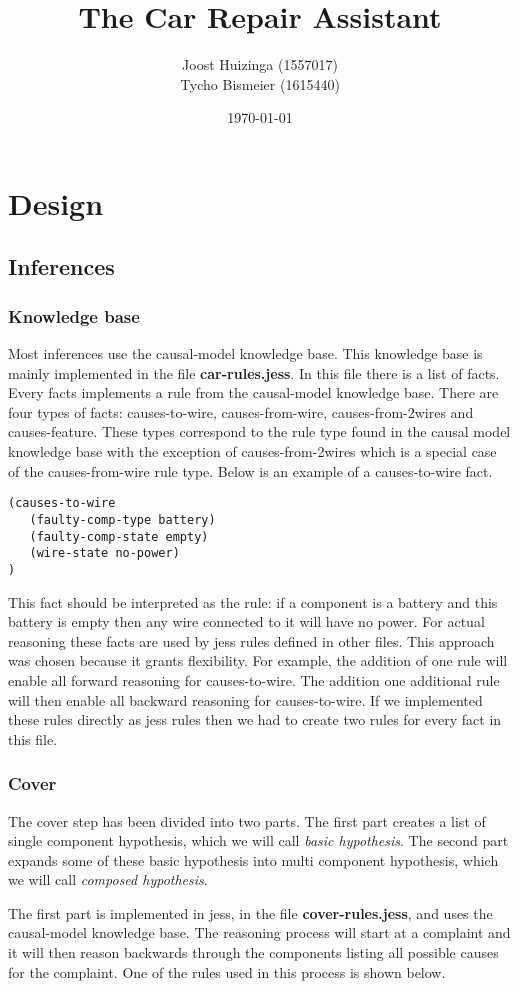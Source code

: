 \documentclass[a4paper,10pt]{article}
\title{The Car Repair Assistant}
\author{
Joost Huizinga (1557017)\\
Tycho Bismeier (1615440)}
\date{\today}
\begin{document}
\section{Design}
\subsection{Inferences}
\subsubsection{Knowledge base}
Most inferences use the causal-model knowledge base. This knowledge base is mainly implemented in the file \textbf{car-rules.jess}. In this file there is a list of facts. Every facts implements a rule from the causal-model knowledge base. There are four types of facts: causes-to-wire, causes-from-wire, causes-from-2wires and causes-feature. These types correspond to the rule type found in the causal model knowledge base with the exception of causes-from-2wires which is a special case of the causes-from-wire rule type. Below is an example of a causes-to-wire fact.

\begin{verbatim}
(causes-to-wire
   (faulty-comp-type battery)
   (faulty-comp-state empty)
   (wire-state no-power)
)
\end{verbatim}

This fact should be interpreted as the rule: if a component is a battery and this battery is empty then any wire connected to it will have no power. For actual reasoning these facts are used by jess rules defined in other files. This approach was chosen because it grants flexibility. For example, the addition of one rule will enable all forward reasoning for causes-to-wire. The addition one additional rule will then enable all backward reasoning for causes-to-wire. If we implemented these rules directly as jess rules then we had to create two rules for every fact in this file.


\subsubsection{Cover}
The cover step has been divided into two parts. The first part creates a list of single component hypothesis, which we will call \emph{basic hypothesis}. The second part expands some of these basic hypothesis into multi component hypothesis, which we will call \emph{composed hypothesis}.

The first part is implemented in jess, in the file \textbf{cover-rules.jess}, and uses the causal-model knowledge base. The reasoning process will start at a complaint and it will then reason backwards through the components listing all possible causes for the complaint. One of the rules used in this process is shown below.
\end{document}
